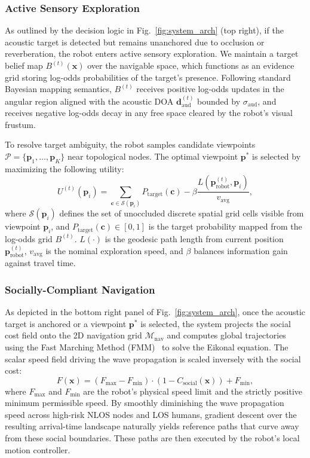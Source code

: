 \subsubsection{Active Sensory Exploration}
As outlined by the decision logic in Fig.~\ref{fig:system_arch} (top right), if the acoustic target is detected but remains unanchored due to occlusion or reverberation, the robot enters active sensory exploration. We maintain a target belief map $B^{(t)}(\mathbf{x})$ over the navigable space, which functions as an evidence grid storing log-odds probabilities of the target's presence. Following standard Bayesian mapping semantics, $B^{(t)}$ receives positive log-odds updates in the angular region aligned with the acoustic DOA $\mathbf{d}_{\mathrm{aud}}^{(t)}$ bounded by $\sigma_{\mathrm{aud}}$, and receives negative log-odds decay in any free space cleared by the robot's visual frustum.

To resolve target ambiguity, the robot samples candidate viewpoints $\mathcal{P} = \{\mathbf{p}_1, \dots, \mathbf{p}_K\}$ near topological nodes. The optimal viewpoint $\mathbf{p}^*$ is selected by maximizing the following utility:
\begin{equation}
    U^{(t)}(\mathbf{p}_i) = \sum_{\mathbf{c} \in \mathcal{S}(\mathbf{p}_i)} P_{\mathrm{target}}(\mathbf{c}) - \beta \frac{L(\mathbf{p}_{\mathrm{robot}}^{(t)}, \mathbf{p}_i)}{v_{\mathrm{avg}}},
    \label{eq:utility}
\end{equation}
where $\mathcal{S}(\mathbf{p}_i)$ defines the set of unoccluded discrete spatial grid cells visible from viewpoint $\mathbf{p}_i$, and $P_{\mathrm{target}}(\mathbf{c}) \in [0,1]$ is the target probability mapped from the log-odds grid $B^{(t)}$. $L(\cdot)$ is the geodesic path length from current position $\mathbf{p}_{\mathrm{robot}}^{(t)}$, $v_{\mathrm{avg}}$ is the nominal exploration speed, and $\beta$ balances information gain against travel time.

\subsubsection{Socially-Compliant Navigation}
As depicted in the bottom right panel of Fig.~\ref{fig:system_arch}, once the acoustic target is anchored or a viewpoint $\mathbf{p}^*$ is selected, the system projects the social cost field onto the 2D navigation grid $\mathcal{M}_{\mathrm{nav}}$ and computes global trajectories using the Fast Marching Method (FMM)~\cite{FastMarchingMethods1999} to solve the Eikonal equation. The scalar speed field driving the wave propagation is scaled inversely with the social cost:
\begin{equation}
    F(\mathbf{x}) = (F_{\max} - F_{\min}) \cdot \left(1 - C_{\mathrm{social}}(\mathbf{x})\right) + F_{\min},
    \label{eq:speed}
\end{equation}
where $F_{\max}$ and $F_{\min}$ are the robot's physical speed limit and the strictly positive minimum permissible speed. By smoothly diminishing the wave propagation speed across high-risk NLOS nodes and LOS humans, gradient descent over the resulting arrival-time landscape naturally yields reference paths that curve away from these social boundaries. These paths are then executed by the robot's local motion controller.
